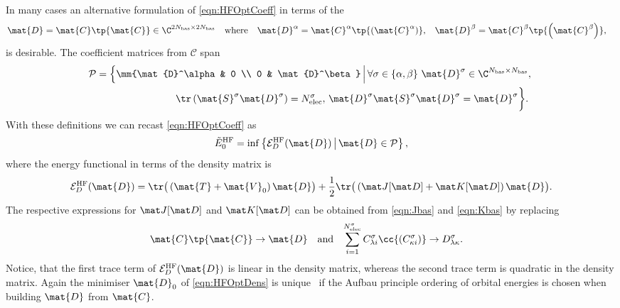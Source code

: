 \begin{rem}
	\noindent
	In many cases an alternative formulation of \eqref{eqn:HFOptCoeff} in terms
	of the 
	\begin{align}
		\label{eqn:Dbas}
		\mat{D} &= \mat{C} \tp{\mat{C}} \in \C^{2\Nbas\times2\Nbas}
		&&\text{where}&
		\mat{D}^\alpha &= \mat{C}^\alpha\tp{\left(\mat{C}^\alpha\right)}, &
		\mat{D}^\beta  &= \mat{C}^\beta \tp{\left(\mat{C}^\beta \right)},
	\end{align}
	is desirable.
	The coefficient matrices from $\mathcal{C}$ span
	\begin{equation}
		\begin{aligned}
		\mathcal{P} &= \left\{
			\mm{\mat{D}^\alpha & 0 \\ 0 & \mat{D}^\beta}
			\, \middle| \,
			\forall \sigma \in \{\alpha, \beta\} \
			\mat{D}^\sigma \in \C^{\Nbas\times\Nbas},
			\right. \\
			&\hspace{80pt}
			\tr\left(\mat{S}^\sigma \mat{D}^\sigma\right) = N_\text{elec}^\sigma, \,
			\mat{D}^\sigma \mat{S}^\sigma \mat{D}^\sigma  = \mat{D}^\sigma
		\bigg\}.
		\end{aligned}
		\label{eqn:HFGrassmann}
	\end{equation}
	With these definitions we can recast \eqref{eqn:HFOptCoeff} as
	\begin{equation}
		\tilde{E}_0^\text{HF} = \inf \left\{
			\Ehf_D(\mat{D})
				\, \middle| \,
				\mat{D} \in \mathcal{P}
		\right\},
		\label{eqn:HFOptDens}
	\end{equation}
	where the energy functional in terms of the density matrix is
	\begin{equation}
		\Ehf_D(\mat{D})
			= \tr \big( \left(\mat{T} + \mat{V}_0 \right) \mat{D} \big)
			+ \frac12 \tr \big( \left(\matJfullD + \matKfullD \right) \mat{D} \big).
		\label{eqn:HFEnergyFunctionalDens}
	\end{equation}
	The respective expressions for $\matJfullD$ and $\matKfullD$
	can be obtained from \eqref{eqn:Jbas} and \eqref{eqn:Kbas}
	by replacing
	\begin{align}
		\label{eqn:DensityReplacement}
		\mat{C}\tp{\mat{C}} &\to \mat{D}
		&&\text{and}&
	\sum_{i=1}^{N_\text{elec}^\sigma}
	C^\sigma_{\lambda i}
	\cc{\left(C^\sigma_{\kappa i}\right)} &\to D^\sigma_{\lambda \kappa}.
	\end{align}
	Notice, that the first trace term of $\Ehf_D(\mat{D})$
	is linear in the density matrix, whereas the second trace term
	is quadratic in the density matrix.
	Again the minimiser $\mat{D}_0$ of \eqref{eqn:HFOptDens}
	is unique~\cite{Cances2000} if the Aufbau principle ordering of orbital
	energies is chosen when building $\mat{D}$ from $\mat{C}$.
\end{rem}

